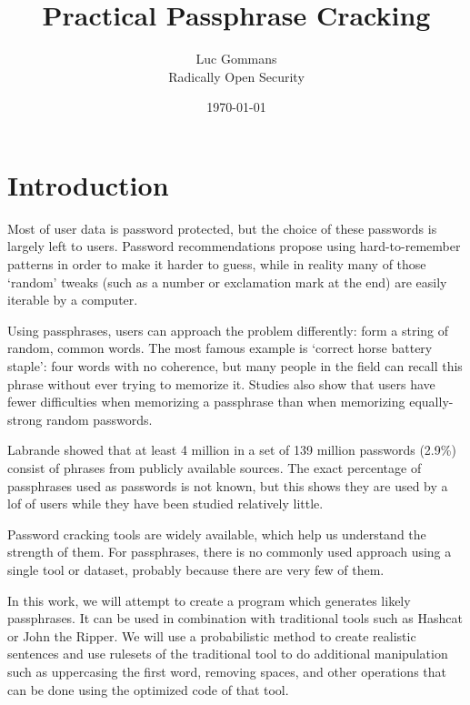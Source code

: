 \documentclass{article}
\begin{document}
\title{Practical Passphrase Cracking}
\date{\today{}}
\author{Luc Gommans \\
	Radically Open Security
}

\maketitle

\section{Introduction}

Most of user data is password protected, but the choice of these passwords is
largely left to users. Password recommendations propose using hard-to-remember
patterns in order to make it harder to guess, while in reality many of those
`random' tweaks (such as a number or exclamation mark at the end) are easily
iterable by a computer.

Using passphrases, users can approach the problem differently: form a string of
random, common words. The most famous example is `correct horse battery
staple': four words with no coherence, but many people in the field can recall
this phrase without ever trying to memorize it\cite{own}. Studies also show
that users have fewer difficulties when memorizing a passphrase than when
memorizing equally-strong random
passwords\cite{behavioral-analysis}\cite{pwd-memorability}.

Labrande\cite{crackmeimfamous} showed that at least 4 million in a set of 139
million passwords (2.9\%) consist of phrases from publicly available sources.
The exact percentage of passphrases used as passwords is not known, but this
shows they are used by a lof of users while they have been studied relatively
little.

Password cracking tools are widely available, which help us understand the
strength of them. For passphrases, there is no commonly used approach using a
single tool or dataset, probably because there are very few of them.

In this work, we will attempt to create a program which generates likely
passphrases. It can be used in combination with traditional tools such as
Hashcat or John the Ripper. We will use a probabilistic method to create
realistic sentences and use rulesets of the traditional tool to do additional
manipulation such as uppercasing the first word, removing spaces, and other
operations that can be done using the optimized code of that tool.
\end{document}

